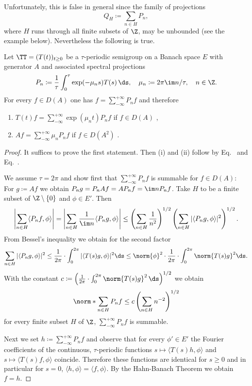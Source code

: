 Unfortunately, this is false in general since the family of projections
\[
Q_{H} \coloneqq \sum_{n \in H} P_{n} ,
\]
where $H$ runs through all finite subsets of\/ $\Z$, may be unbounded (see the example below).
Nevertheless the following is true.
\begin{theorem}\label{thm:a3-5.4}
Let $\TT = (T(t))_{t \geq 0}$ be a $\tau$-periodic semigroup on a Banach space $E$ with generator $A$ and associated spectral projections
\[
P_{n} \coloneqq  \frac{1}{\tau}\int_{0}^{\tau} \exp(-\mu_{n}s)T(s) \, \ds, \quad \mu_{n} \coloneqq 2\pi\im n/\tau, \quad n \in \Z  .
\]
For every $f \in D(A)$ one has $f = \sum_{-\infty}^{+\infty} P_{n}f$ and therefore
\begin{enumerate}[\upshape (i)]
\item 
$T(t)f = \sum_{-\infty}^{+\infty} \exp(\mu_{n}t)P_{n}f$ \quad if\/ $f \in D(A)$ ,

\item 
$Af = \sum_{-\infty}^{+\infty} \mu_{n}P_{n}f$ \quad if\/ $f \in D(A^{2})$ .
\end{enumerate}
\end{theorem}
\begin{proof}
It suffices to prove the first statement. Then (i) and (ii) follow by Eq.~ and Eq.~.

We assume $\tau = 2\pi$ and show first that $\sum_{-\infty}^{+\infty} P_{n}f$ is summable for $f \in D(A)$: For $g \coloneqq Af$ we obtain $P_{n}g = P_{n}Af = AP_{n}f = \im nP_{n}f$.
Take $H$ to be a finite subset of\/ $\Z \setminus \{0\}$ and $\phi \in E'$. Then
\[
\left|\sum_{n \in H} \langle P_{n}f,\phi \rangle\right|
= \left|\sum_{n \in H} \frac{1}{\im n} \langle P_{n}g,\phi \rangle\right| 
\leq \left(\sum_{n \in H} \frac{1}{n^2}\right)^{1/2}\left(\sum_{n \in H} |\langle P_{n}g,\phi \rangle|^{2}\right)^{1/2} .
\]
From Bessel's inequality we obtain for the second factor
\[
\sum_{n \in H} |\langle P_{n}g,\phi \rangle|^{2} \leq \frac{1}{2\pi} \cdot \int_{0}^{2\pi} |\langle T(s)g,\phi \rangle|^{2}  \ds 
\leq \norm{\phi}^{2} \cdot \frac{1}{2\pi} \cdot \int_{0}^{2\pi} \norm{T(s)g}^{2}  \ds  .
\]
With the constant $c \coloneqq \left(\frac{1}{2\pi} \cdot \int_{0}^{2\pi} \norm{T(s)g}^{2} \, \ds\right)^{1/2}$ we obtain
\[
\norm*{\sum_{n \in H} P_{n}f} \leq c\left(\sum_{n \in H} n^{-2}\right)^{1/2}
\]
for every finite subset $H$ of\/ $\Z$, \ie $\sum_{-\infty}^{+\infty} P_{n}f$ is summable.

Next we set $h \coloneqq \sum_{-\infty}^{+\infty} P_{n}f$ and observe that for every $\phi' \in E'$ the Fourier coefficients of the continuous, $\tau$-periodic functions
$s \mapsto \langle T(s)h,\phi \rangle$ and $s \mapsto \langle T(s)f,\phi \rangle$
coincide.
Therefore these functions are identical for $s \geq 0$ and in particular for $s = 0$, \ie 
$\langle h, \phi \rangle = \langle f, \phi \rangle$.
By the Hahn-Banach Theorem we obtain $f = h$.
\end{proof}

